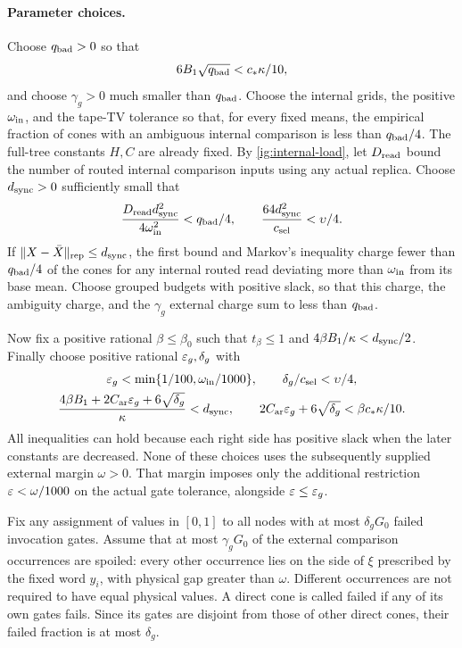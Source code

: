 \paragraph{Parameter choices.}
Choose $q_{\rm bad}>0$ so that
\begin{equation}\label{ig:qbad}
 6B_1\sqrt{q_{\rm bad}}<c_*\kappa/10,
\end{equation}
and choose $\gamma_g>0$ much smaller than $q_{\rm bad}$. Choose the
internal grids, the positive $\omega_{\rm in}$, and the tape-TV tolerance
so that, for every fixed means, the empirical fraction of cones with an
ambiguous internal comparison is less than $q_{\rm bad}/4$.
The full-tree constants $H,C$ are already fixed. By
\eqref{ig:internal-load}, let $D_{\rm read}$ bound the number of routed
internal comparison inputs using any actual replica. Choose
$d_{\rm sync}>0$ sufficiently small that
\begin{equation}\label{ig:sync-choice}
 \frac{D_{\rm read}d_{\rm sync}^2}{4\omega_{\rm in}^2}
       <q_{\rm bad}/4,
 \qquad
 \frac{64d_{\rm sync}^2}{c_{\rm sel}}<\upsilon/4.
\end{equation}
If $\|X-\bar X\|_{\rm rep}\le d_{\rm sync}$, the first bound and
Markov's inequality charge fewer than $q_{\rm bad}/4$ of the cones for
any internal routed read deviating more than $\omega_{\rm in}$ from its
base mean. Choose grouped budgets with positive slack, so that this
charge, the ambiguity charge, and the $\gamma_g$ external charge sum
to less than $q_{\rm bad}$.

Now fix a positive rational $\beta\le\beta_0$ such that
$t_\beta\le1$ and $4\beta B_1/\kappa<d_{\rm sync}/2$.
Finally choose positive rational $\varepsilon_g,\delta_g$ with
\begin{gather}
 \varepsilon_g<\min\{1/100,\omega_{\rm in}/1000\},\qquad
 \delta_g/c_{\rm sel}<\upsilon/4,
 \label{ig:last-small}\\
 \frac{4\beta B_1+2C_{\rm ar}\varepsilon_g+6\sqrt{\delta_g}}
         {\kappa}<d_{\rm sync},\qquad
 2C_{\rm ar}\varepsilon_g+6\sqrt{\delta_g}
         <\beta c_*\kappa/10.
 \label{ig:epsilon-delta}
\end{gather}
All inequalities can hold because each right side has positive slack
when the later constants are decreased. None of these choices uses the
subsequently supplied external margin $\omega>0$. That margin imposes
only the additional restriction $\varepsilon<\omega/1000$ on the actual gate
tolerance, alongside $\varepsilon\le\varepsilon_g$.

Fix any assignment of values in $[0,1]$ to all nodes with at most
$\delta_gG_0$ failed invocation gates. Assume that at most
$\gamma_gG_0$ of the external comparison occurrences are spoiled:
every other occurrence lies on the side of $\xi$ prescribed by the
fixed word $y_i$, with physical gap greater than $\omega$.
Different occurrences are not required to have equal physical values.
A direct cone is called failed if any of its own gates fails. Since its
gates are disjoint from those of other direct cones, their failed fraction
is at most $\delta_g$.

